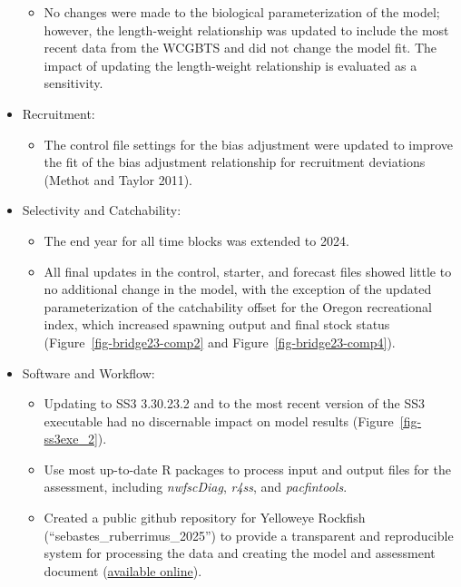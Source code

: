 \documentclass[
]{scrartcl}
\providecommand{\tightlist}{%
  \setlength{\itemsep}{0pt}\setlength{\parskip}{0pt}}\usepackage{longtable,booktabs,array}
\begin{document}
\begin{itemize}
  \begin{itemize}
  \tightlist
  \item
    No changes were made to the biological parameterization of the
    model; however, the length-weight relationship was updated to
    include the most recent data from the WCGBTS and did not change the
    model fit. The impact of updating the length-weight relationship is
    evaluated as a sensitivity.
  \end{itemize}
\item
  Recruitment:

  \begin{itemize}
  \tightlist
  \item
    The control file settings for the bias adjustment were updated to
    improve the fit of the bias adjustment relationship for recruitment
    deviations (Methot and Taylor 2011).
  \end{itemize}
\item
  Selectivity and Catchability:

  \begin{itemize}
  \tightlist
  \item
    The end year for all time blocks was extended to 2024.
  \item
    All final updates in the control, starter, and forecast files showed
    little to no additional change in the model, with the exception of
    the updated parameterization of the catchability offset for the
    Oregon recreational index, which increased spawning output and final
    stock status (Figure~\ref{fig-bridge23-comp2} and
    Figure~\ref{fig-bridge23-comp4}).
  \end{itemize}
\item
  Software and Workflow:

  \begin{itemize}
  \tightlist
  \item
    Updating to SS3 3.30.23.2 and to the most recent version of the SS3
    executable had no discernable impact on model results
    (Figure~\ref{fig-ss3exe_2}).
  \item
    Use most up-to-date R packages to process input and output files for
    the assessment, including \emph{nwfscDiag}, \emph{r4ss}, and
    \emph{pacfintools}.
  \item
    Created a public github repository for Yelloweye Rockfish
    (``sebastes\_ruberrimus\_2025'') to provide a transparent and
    reproducible system for processing the data and creating the model
    and assessment document
    (\href{https://github.com/rclairer/Sebastes_ruberrimus_2025}{available
    online}).
  \end{itemize}
\end{itemize}
\end{document}
